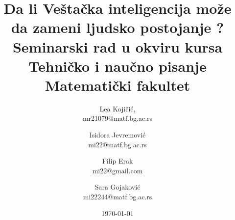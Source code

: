 \documentclass[a4paper]{article}
\begin{document}
\title{Da li Veštačka inteligencija može da zameni ljudsko postojanje ?\\ 
\small{Seminarski rad u okviru kursa\\Tehničko i naučno pisanje\\ Matematički fakultet}}

\author{Lea Kojičić, \\ mr21079@matf.bg.ac.rs \and
        Isidora Jevremović \\ mi22@matf.bg.ac.rs \and
        Filip Erak \\  mi22@gmail.com \and
        Sara Gojaković \\ mi22244@matf.bg.ac.rs}
\date{\today}
\maketitle
\end{document}
